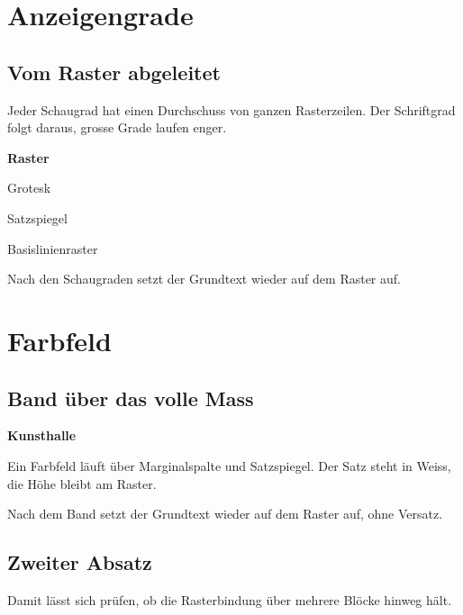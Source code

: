 \documentclass[tint=true]{swisstex}
\begin{document}

\section{Anzeigengrade}

\subsection{Vom Raster abgeleitet}

Jeder Schaugrad hat einen Durchschuss von ganzen Rasterzeilen. Der
Schriftgrad folgt daraus, grosse Grade laufen enger.

\begin{gridblock}
{\bfseries Raster}\par
{Grotesk}\par
{Satzspiegel}\par
{Basislinienraster}
\end{gridblock}

Nach den Schaugraden setzt der Grundtext wieder auf dem Raster auf.

\section{Farbfeld}

\subsection{Band über das volle Mass}

\begin{swissband}
{\bfseries Kunsthalle}\par\vspace{6pt}
Ein Farbfeld läuft über Marginalspalte und Satzspiegel. Der Satz steht in
Weiss, die Höhe bleibt am Raster.
\end{swissband}

Nach dem Band setzt der Grundtext wieder auf dem Raster auf, ohne Versatz.

\subsection{Zweiter Absatz}

Damit lässt sich prüfen, ob die Rasterbindung über mehrere Blöcke hinweg
hält.
\end{document}

